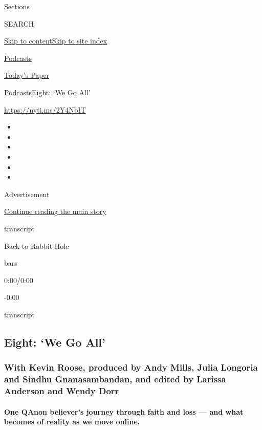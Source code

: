Sections

SEARCH

\protect\hyperlink{site-content}{Skip to
content}\protect\hyperlink{site-index}{Skip to site index}

\href{https://www.nytimes3xbfgragh.onion/spotlight/podcasts}{Podcasts}

\href{https://myaccount.nytimes3xbfgragh.onion/auth/login?response_type=cookie\&client_id=vi}{}

\href{https://www.nytimes3xbfgragh.onion/section/todayspaper}{Today's
Paper}

\href{/spotlight/podcasts}{Podcasts}\textbar{}Eight: `We Go All'

\url{https://nyti.ms/2Y4NbIT}

\begin{itemize}
\item
\item
\item
\item
\item
\item
\end{itemize}

Advertisement

\protect\hyperlink{after-top}{Continue reading the main story}

transcript

Back to Rabbit Hole

bars

0:00/0:00

-0:00

transcript

\hypertarget{eight-we-go-all}{%
\subsection{Eight: `We Go All'}\label{eight-we-go-all}}

\hypertarget{with-kevin-roose-produced-by-andy-mills-julia-longoria-and-sindhu-gnanasambandan-and-edited-by-larissa-anderson-and-wendy-dorr}{%
\subsubsection{With Kevin Roose, produced by Andy Mills, Julia Longoria
and Sindhu Gnanasambandan, and edited by Larissa Anderson and Wendy
Dorr}\label{with-kevin-roose-produced-by-andy-mills-julia-longoria-and-sindhu-gnanasambandan-and-edited-by-larissa-anderson-and-wendy-dorr}}

\hypertarget{one-qanon-believers-journey-through-faith-and-loss--and-what-becomes-of-reality-as-we-move-online}{%
\paragraph{One QAnon believer's journey through faith and loss --- and
what becomes of reality as we move
online.}\label{one-qanon-believers-journey-through-faith-and-loss--and-what-becomes-of-reality-as-we-move-online}}

